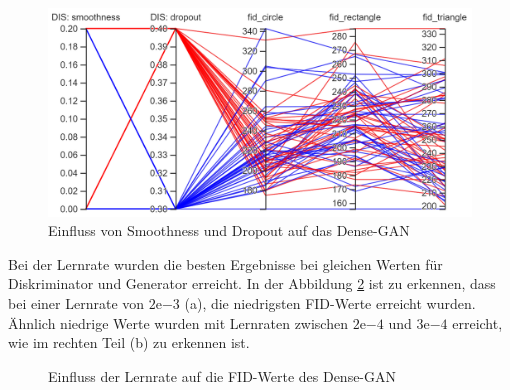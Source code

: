 \begin{figure}[H]
	\centering
	\includegraphics[width=0.6\textheight]{kapitel/5_ergebnisse/densegan/hyperparameter_dropout_smooth.PNG}
	\caption{Einfluss von Smoothness und Dropout auf das Dense-GAN}
	\label{ergebnis:densegan-hyper-smoot-drop}
\end{figure}

Bei der Lernrate wurden die besten Ergebnisse bei gleichen Werten für Diskriminator und Generator erreicht.  
In der Abbildung \ref{ergebnis:densegan-lr} ist zu erkennen, dass bei einer Lernrate von $2\mathrm{e}{-3}$ (a), die niedrigsten FID-Werte erreicht wurden.
Ähnlich niedrige Werte wurden mit Lernraten zwischen $2\mathrm{e}{-4}$ und $3\mathrm{e}{-4}$ erreicht, wie im rechten Teil (b) zu erkennen ist.

\begin{figure}[H]
	\centering
	\qquad
	\caption{Einfluss der Lernrate auf die FID-Werte des Dense-GAN}
	\label{ergebnis:densegan-lr}
\end{figure}

